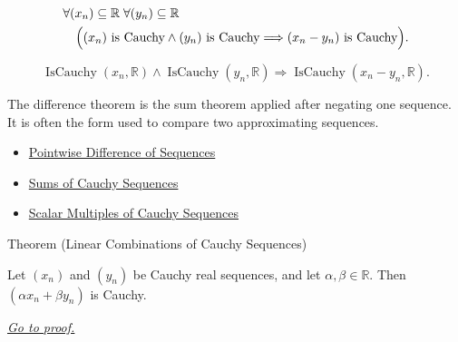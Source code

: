 \begin{remark*}
\[
\begin{aligned}
&\forall (x_n)\subseteq\mathbb{R}\;\forall (y_n)\subseteq\mathbb{R}\\
&\quad
\Bigl(
  (x_n)\text{ is Cauchy}
  \land
  (y_n)\text{ is Cauchy}
  \Longrightarrow
  (x_n-y_n)\text{ is Cauchy}
\Bigr).
\end{aligned}
\]
\end{remark*}

\begin{remark*}
\[
\operatorname{IsCauchy}(x_n,\mathbb{R})
\land
\operatorname{IsCauchy}(y_n,\mathbb{R})
\Longrightarrow
\operatorname{IsCauchy}(x_n-y_n,\mathbb{R}).
\]
\end{remark*}

\begin{remark*}[Interpretation]
The difference theorem is the sum theorem applied after negating one
sequence. It is often the form used to compare two approximating sequences.
\end{remark*}

\begin{dependencies}
\begin{itemize}
  \item \hyperref[def:pointwise-difference-sequence]{Pointwise Difference of Sequences}
  \item \hyperref[thm:sum-cauchy-sequences]{Sums of Cauchy Sequences}
  \item \hyperref[thm:scalar-multiple-cauchy-sequence]{Scalar Multiples of Cauchy Sequences}
\end{itemize}
\end{dependencies}


\begin{theorembox}{Theorem (Linear Combinations of Cauchy Sequences)}
\begin{theorem}
\label{thm:linear-combination-cauchy-sequences}
Let $(x_n)$ and $(y_n)$ be Cauchy real sequences, and let
$\alpha,\beta\in\mathbb{R}$. Then $(\alpha x_n+\beta y_n)$ is Cauchy.

\smallskip
\noindent
\hyperref[prf:linear-combination-cauchy-sequences]{\textit{Go to proof.}}
\end{theorem}
\end{theorembox}

